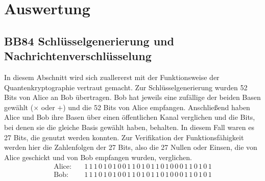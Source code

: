 \section{Auswertung}
\label{sec:Auswertung}


\subsection{BB84 Schlüsselgenerierung und Nachrichtenverschlüsselung}
\label{sec:a1}
In diesem Abschnitt wird sich zuallererst mit der Funktionsweise der Quantenkryptographie vertraut gemacht. 
Zur Schlüsselgenerierung wurden 52 Bits von Alice an Bob übertragen. Bob hat jeweils eine zufällige der beiden Basen gewählt ($\times$ oder $+$) 
und die 52 Bits von Alice empfangen. Anschließend haben Alice und Bob ihre Basen über einen öffentlichen Kanal verglichen und die Bits, bei denen sie die gleiche Basis gewählt haben, behalten.
In diesem Fall waren es 27 Bits, die genutzt werden konnten. Zur Verifikation der Funktionsfähigkeit werden hier die Zahlenfolgen der 27 Bits, also die 27 Nullen oder Einsen, die von Alice geschickt und von Bob 
empfangen wurden, verglichen.
\begin{align*}
  \text{Alice:} & \quad 1 \, 1 \, 1 \, 0 \, 1 \, 0 \, 1 \, 0 \, 0 \, 1 \, 1 \, 0 \, 1 \, 0 \, 1 \, 1 \, 0 \, 1 \, 0 \, 0 \, 0 \, 1 \, 1 \, 0 \, 1 \, 0 \, 1 \\
  \text{Bob}: & \quad 1 \, 1 \, 1 \, 0 \, 1 \, 0 \, 1 \, 0 \, 0 \, 1 \, 1 \, 0 \, 1 \, 0 \, 1 \, 1 \, 0 \, 1 \, 0 \, 0 \, 0 \, 1 \, 1 \, 0 \, 1 \, 0 \, 1
\end{align*}

